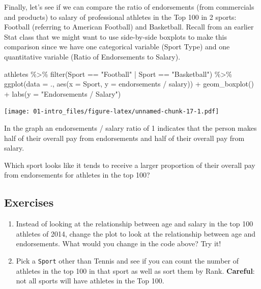 \documentclass[
]{book}
\newenvironment{Shaded}{\begin{snugshade}}{\end{snugshade}}
\newcommand{\AttributeTok}[1]{\textcolor[rgb]{0.77,0.63,0.00}{#1}}
\newcommand{\FunctionTok}[1]{\textcolor[rgb]{0.00,0.00,0.00}{#1}}
\newcommand{\NormalTok}[1]{#1}
\newcommand{\SpecialCharTok}[1]{\textcolor[rgb]{0.00,0.00,0.00}{#1}}
\newcommand{\StringTok}[1]{\textcolor[rgb]{0.31,0.60,0.02}{#1}}
\begin{document}
Finally, let's see if we can compare the ratio of endorsements (from commercials and products) to salary of professional athletes in the Top 100 in 2 sports: Football (referring to American Football) and Basketball. Recall from an earlier Stat class that we might want to use side-by-side boxplots to make this comparison since we have one categorical variable (Sport Type) and one quantitative variable (Ratio of Endorsements to Salary).

\begin{Shaded}
\begin{Highlighting}[]
\NormalTok{athletes }\SpecialCharTok{\%\textgreater{}\%} \FunctionTok{filter}\NormalTok{(Sport }\SpecialCharTok{==} \StringTok{"Football"} \SpecialCharTok{|}\NormalTok{ Sport }\SpecialCharTok{==} \StringTok{"Basketball"}\NormalTok{) }\SpecialCharTok{\%\textgreater{}\%}
  \FunctionTok{ggplot}\NormalTok{(}\AttributeTok{data =}\NormalTok{ ., }\FunctionTok{aes}\NormalTok{(}\AttributeTok{x =}\NormalTok{ Sport, }\AttributeTok{y =}\NormalTok{ endorsements }\SpecialCharTok{/}\NormalTok{ salary)) }\SpecialCharTok{+} 
  \FunctionTok{geom\_boxplot}\NormalTok{() }\SpecialCharTok{+}
  \FunctionTok{labs}\NormalTok{(}\AttributeTok{y =} \StringTok{"Endorsements / Salary"}\NormalTok{)}
\end{Highlighting}
\end{Shaded}

\texttt{[image: 01-intro\_files/figure-latex/unnamed-chunk-17-1.pdf]}

In the graph an endorsements / salary ratio of 1 indicates that the person makes half of their overall pay from endorsements and half of their overall pay from salary.

Which sport looks like it tends to receive a larger proportion of their overall pay from endorsements for athletes in the top 100?

\hypertarget{exercise-1-2}{%
\subsection{Exercises}\label{exercise-1-2}}

\begin{enumerate}
\def\labelenumi{\arabic{enumi}.}
\item
  Instead of looking at the relationship between age and salary in the top 100 athletes of 2014, change the plot to look at the relationship between age and endorsements. What would you change in the code above? Try it!
\item
  Pick a \texttt{Sport} other than Tennis and see if you can count the number of athletes in the top 100 in that sport as well as sort them by Rank. \textbf{Careful}: not all sports will have athletes in the Top 100.
\end{enumerate}
\end{document}
